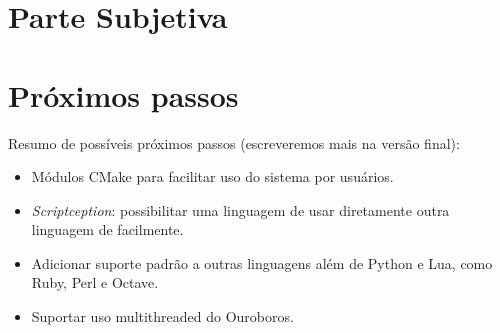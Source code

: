 \chapter*{Parte Subjetiva}
\label{sec:parte_subjetiva}

\newcommand\materia[3]{\noindent \textbf{#1} - \texttt{#2}\\\indent #3\vspace{0.5cm}\\}





\chapter{Próximos passos}
\label{sec:proximos_passos}

Resumo de possíveis próximos passos (escreveremos mais na versão final):
\begin{itemize}
  \item Módulos CMake para facilitar uso do sistema por usuários.
  \item \emph{Scriptception}: possibilitar uma linguagem de \script{} usar diretamente
    outra linguagem de \script{} facilmente.
  \item Adicionar suporte padrão a outras linguagens além de Python e Lua, como Ruby, Perl
    e Octave.
  \item Suportar uso multithreaded do Ouroboros.
\end{itemize}
